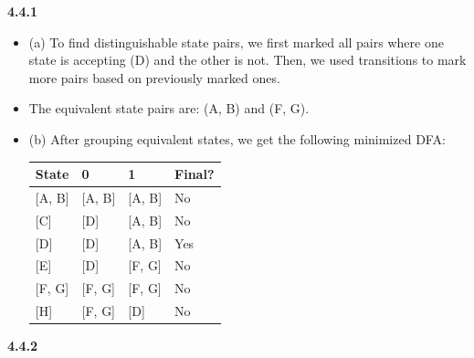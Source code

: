 \documentclass{article}
\theoremstyle{theorem}
\theoremstyle{definition}
\theoremstyle{remark}
\begin{document}
\textbf{4.4.1}

\begin{itemize}
    \item (a) To find distinguishable state pairs, we first marked all pairs where one state is accepting (D) and the other is not. Then, we used transitions to mark more pairs based on previously marked ones.
    \item The equivalent state pairs are: (A, B) and (F, G).
    \item (b) After grouping equivalent states, we get the following minimized DFA:

    \begin{center}
    \begin{tabular}{|l|l|l|l|}
        \hline
        State & 0 & 1 & Final? \\
        \hline
        \textnormal{[A, B]} & \textnormal{[A, B]} & \textnormal{[A, B]} & No \\
        \textnormal{[C]} & \textnormal{[D]} & \textnormal{[A, B]} & No \\
        \textnormal{[D]} & \textnormal{[D]} & \textnormal{[A, B]} & Yes \\
        \textnormal{[E]} & \textnormal{[D]} & \textnormal{[F, G]} & No \\
        \textnormal{[F, G]} & \textnormal{[F, G]} & \textnormal{[F, G]} & No \\
        \textnormal{[H]} & \textnormal{[F, G]} & \textnormal{[D]} & No \\
        \hline
    \end{tabular}
    \end{center}
\end{itemize}


\textbf{4.4.2}
\end{document}
